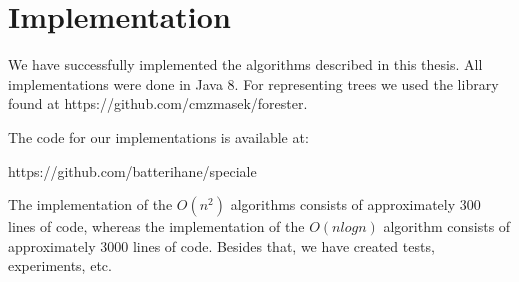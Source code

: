 \chapter{Implementation}
We have successfully implemented the algorithms described in this thesis. All implementations were done in Java 8. For representing trees we used the library found at https://github.com/cmzmasek/forester.

The code for our implementations is available at:

https://github.com/batterihane/speciale

The implementation of the $O(n^2)$ algorithms consists of approximately 300 lines of code, whereas the implementation of the $O(nlogn)$ algorithm consists of approximately 3000 lines of code. Besides that, we have created tests, experiments, etc.


